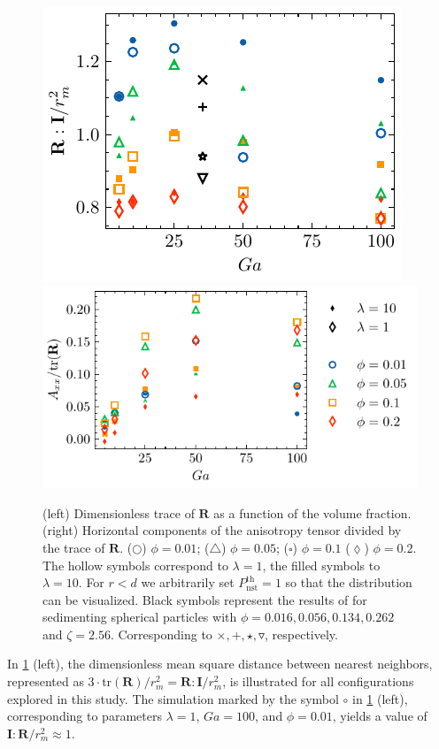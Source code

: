 \begin{figure}[h!]
    \centering
    \includegraphics[height=0.3\textwidth]{image/HOMOGENEOUS_NEW/PA/trR.pdf}
    \includegraphics[height=0.3\textwidth]{image/HOMOGENEOUS_NEW/PA/Axx.pdf}
    \caption{
        (left) Dimensionless trace of $\textbf{R}$ as a function of the volume fraction.%
        (right) Horizontal components of the anisotropy tensor divided by the trace of $\textbf{R}$. %
    ($\pmb\bigcirc$) $\phi = 0.01$; ($\pmb\triangle$) $ \phi = 0.05$; ($\pmb\square$) $\phi = 0.1$ ($\pmb\lozenge$) $\phi = 0.2$.
    The hollow symbols correspond to $\lambda = 1$, the filled symbols to $\lambda = 10$.
    For $r<d$ we arbitrarily set $P_\text{nst}^\text{th} = 1$ so that the distribution can be visualized.
    Black symbols represent the results of \citet{zhang2023evolution} for sedimenting spherical particles with $\phi = 0.016,0.056,0.134,0.262$ and $\zeta = 2.56$. %
    Corresponding to $\pmb\times,\pmb +, \pmb\star , \pmb\triangledown$, respectively.
    }
    \label{fig:A}
\end{figure}
In \ref{fig:A} (left), the dimensionless mean square distance between nearest neighbors, represented as $3\cdot\text{tr}(\textbf{R})/r_m^2 = \textbf{R}:\textbf{I}/r_m^2$, is illustrated for all configurations explored in this study. 
The simulation marked by the symbol \textcolor{col1}{$\pmb\circ$} in \ref{fig:A} (left), corresponding to parameters $\lambda = 1$, $Ga = 100$, and $\phi = 0.01$, yields a value of $\textbf{I}:\textbf{R}/r_m^2 \approx 1$. 

